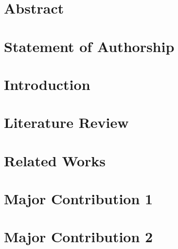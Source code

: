 \documentclass[twoside,openright,titlepage,numbers=noenddot,headinclude,footinclude=true,cleardoublepage=empty,listof=totoc,paper=a4,fontsize=11pt,australian,twoside=semi,DIV=calc]{scrreprt}
\begin{document}
  \frenchspacing
  \raggedbottom
  
  \pagestyle{plain}
  
  
  \singlespacing
  
  
  
  \onehalfspacing
  
  
  \chapter*{Abstract}
  
  
  \chapter*{Statement of Authorship}
  
  
  
  
  
  
  \cleardoublepage
  \pagestyle{scrheadings}
  \onehalfspacing
  
  \chapter{Introduction}\label{c:Introduction}
  
  
  \chapter{Literature Review}\label{c:Background}
  
  
  \chapter{Related Works}\label{c:Related-Works}
  
  
  \chapter{Major Contribution 1}\label{c:Contribution-1}
  
  
  \chapter{Major Contribution 2}\label{c:Contribution-2}
  
\end{document}
